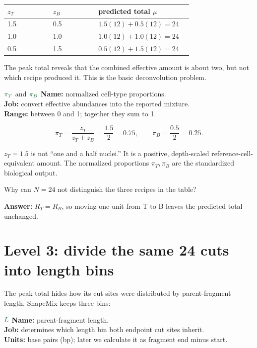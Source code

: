 \documentclass[11pt]{article}
\newcommand{\calcq}[1]{\textcolor{calcteal!85!black}{#1}}
\newcommand{\outputq}[1]{\textcolor{outputgreen!85!black}{#1}}
\begin{document}
\begin{center}
\begin{tabular}{C{0.22\linewidth}C{0.22\linewidth}C{0.30\linewidth}}
\toprule
\(z_T\) & \(z_B\) & predicted total \(\mu\) \\
 & 0.5 & \(1.5(12)+0.5(12)=24\) \\
1.0 & 1.0 & \(1.0(12)+1.0(12)=24\) \\
0.5 & 1.5 & \(0.5(12)+1.5(12)=24\) \\
\bottomrule
\end{tabular}
\end{center}

The peak total reveals that the combined effective amount is about two, but not
which recipe produced it. This is the basic deconvolution problem.

\begin{newvar}{\(\outputq{\pi_T}\) and \(\outputq{\pi_B}\)}
\textbf{Name:} normalized cell-type proportions.\\
\textbf{Job:} convert effective abundances into the reported mixture.\\
\textbf{Range:} between 0 and 1; together they sum to 1.
\end{newvar}

\[
\pi_T=\frac{z_T}{z_T+z_B}
=\frac{1.5}{2}=0.75,
\qquad
\pi_B=\frac{0.5}{2}=0.25.
\]

\begin{watchout}
\(z_T=1.5\) is not “one and a half nuclei.” It is a positive, depth-scaled
reference-cell-equivalent amount. The normalized proportions \(\pi_T,\pi_B\)
are the standardized biological output.
\end{watchout}

\begin{checkpoint}
Why can \(N=24\) not distinguish the three recipes in the table?

\textbf{Answer:} \(R_T=R_B\), so moving one unit from T to B leaves the predicted
total unchanged.
\end{checkpoint}

\section{Level 3: divide the same 24 cuts into length bins}

The peak total hides how its cut sites were distributed by parent-fragment
length. ShapeMix keeps three bins:

\begin{newvar}{\(\calcq{L}\)}
\textbf{Name:} parent-fragment length.\\
\textbf{Job:} determines which length bin both endpoint cut sites inherit.\\
\textbf{Units:} base pairs (bp); later we calculate it as fragment end minus start.
\end{newvar}
\end{document}
